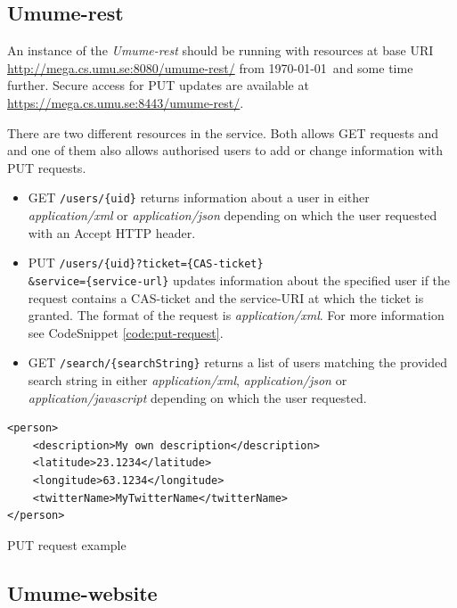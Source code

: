 \documentclass[titlepage, twocolumn, a4paper, 10pt]{article}
\begin{document}
\subsection{Umume-rest}
An instance of the \textit{Umume-rest} should be running with
resources at base URI \url{http://mega.cs.umu.se:8080/umume-rest/}
from \today\ and some time further. Secure access for PUT updates are
available at \url{https://mega.cs.umu.se:8443/umume-rest/}.

There are two different resources in the service. Both allows GET
requests and and one of them also allows authorised users to add or
change information with PUT requests.
\begin{itemize}
\item GET \verb!/users/{uid}! returns information about a user in
  either \textit{application/xml} or \textit{application/json}
  depending on which the user requested with an Accept HTTP header.
\item PUT
  \texttt{/users/\{uid\}?ticket=\{CAS-ticket\}\\\&service=\{service-url\}}
  updates information about the specified user if the request contains
  a CAS-ticket and the service-URI at which the ticket is granted. The
  format of the request is \textit{application/xml}. For more
  information see CodeSnippet \ref{code:put-request}.
\item GET \verb!/search/{searchString}! returns a list of users
  matching the provided search string in either
  \textit{application/xml}, \textit{application/json} or
  \textit{application/javascript} depending on which the user
  requested.
\end{itemize}

\begin{code}
  \begin{footnotesize}
\begin{verbatim}
<person>
    <description>My own description</description>
    <latitude>23.1234</latitude>
    <longitude>63.1234</longitude>
    <twitterName>MyTwitterName</twitterName>
</person>
\end{verbatim}
  \end{footnotesize}
  \caption{PUT request example}\label{code:put-request}
\end{code}

\subsection{Umume-website}
\end{document}
